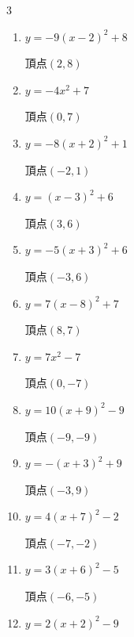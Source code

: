 \begin{multicols}{3}
\begin{enumerate}
\columnbreak %

  \item $\displaystyle y=-9\left( x-2\right)^{2}+8$

        $\displaystyle 頂点\left( 2 , 8 \right)$

  \item $\displaystyle y=-4x^{2}+7$

        $\displaystyle 頂点\left( 0 , 7 \right)$

  \item $\displaystyle y=-8\left( x+2\right)^{2}+1$

        $\displaystyle 頂点\left( -2 , 1 \right)$

  \item $\displaystyle y=\left( x-3\right)^{2}+6$

        $\displaystyle 頂点\left( 3 , 6 \right)$

  \item $\displaystyle y=-5\left( x+3\right)^{2}+6$

        $\displaystyle 頂点\left( -3 , 6 \right)$

  \item $\displaystyle y=7\left( x-8\right)^{2}+7$

        $\displaystyle 頂点\left( 8 , 7 \right)$

  \item $\displaystyle y=7x^{2}-7$

        $\displaystyle 頂点\left( 0 , -7 \right)$

  \item $\displaystyle y=10\left( x+9\right)^{2}-9$

        $\displaystyle 頂点\left( -9 , -9 \right)$

  \item $\displaystyle y=-\left( x+3\right)^{2}+9$

        $\displaystyle 頂点\left( -3 , 9 \right)$

  \item $\displaystyle y=4\left( x+7\right)^{2}-2$

        $\displaystyle 頂点\left( -7 , -2 \right)$

  \item $\displaystyle y=3\left( x+6\right)^{2}-5$

        $\displaystyle 頂点\left( -6 , -5 \right)$

  \item $\displaystyle y=2\left( x+2\right)^{2}-9$


\end{enumerate}
\end{multicols}

